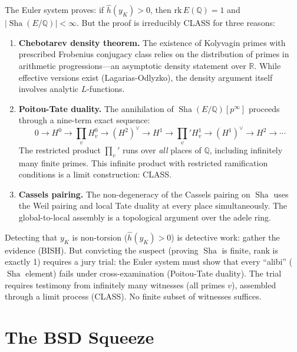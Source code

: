 \documentclass[11pt,twoside,openany]{report}
\theoremstyle{remark}
\newcommand{\BISH}{\textsf{BISH}}
\newcommand{\CLASS}{\textsf{CLASS}}
\DeclareMathOperator{\Sha}{Sha}
\begin{document}
The Euler system proves: if $\hat{h}(y_K) > 0$, then $\mathrm{rk}\, E(\mathbb{Q}) = 1$ and $|\Sha(E/\mathbb{Q})| < \infty$. But the proof is irreducibly \CLASS{} for three reasons:

\begin{enumerate}
  \item \textbf{Chebotarev density theorem.} The existence of Kolyvagin primes with prescribed Frobenius conjugacy class relies on the distribution of primes in arithmetic progressions---an asymptotic density statement over $\mathbb{R}$. While effective versions exist (Lagarias-Odlyzko), the density argument itself involves analytic $L$-functions.

  \item \textbf{Poitou-Tate duality.} The annihilation of $\Sha(E/\mathbb{Q})[p^\infty]$ proceeds through a nine-term exact sequence:
  \[
    0 \to H^0 \to \textstyle\prod_v H^0_v \to (H^2)^\vee \to H^1 \to \textstyle\prod_v' H^1_v \to (H^1)^\vee \to H^2 \to \cdots
  \]
  The restricted product $\prod_v'$ runs over \emph{all} places of $\mathbb{Q}$, including infinitely many finite primes. This infinite product with restricted ramification conditions is a limit construction: \CLASS.

  \item \textbf{Cassels pairing.} The non-degeneracy of the Cassels pairing on $\Sha$ uses the Weil pairing and local Tate duality at every place simultaneously. The global-to-local assembly is a topological argument over the adele ring.
\end{enumerate}

\begin{analogybox}
Detecting that $y_K$ is non-torsion ($\hat{h}(y_K) > 0$) is detective work: gather the evidence (\BISH). But convicting the suspect (proving $\Sha$ is finite, rank is exactly 1) requires a jury trial: the Euler system must show that every ``alibi'' ($\Sha$ element) fails under cross-examination (Poitou-Tate duality). The trial requires testimony from infinitely many witnesses (all primes $v$), assembled through a limit process (\CLASS). No finite subset of witnesses suffices.
\end{analogybox}


\section{The BSD Squeeze}
\end{document}
